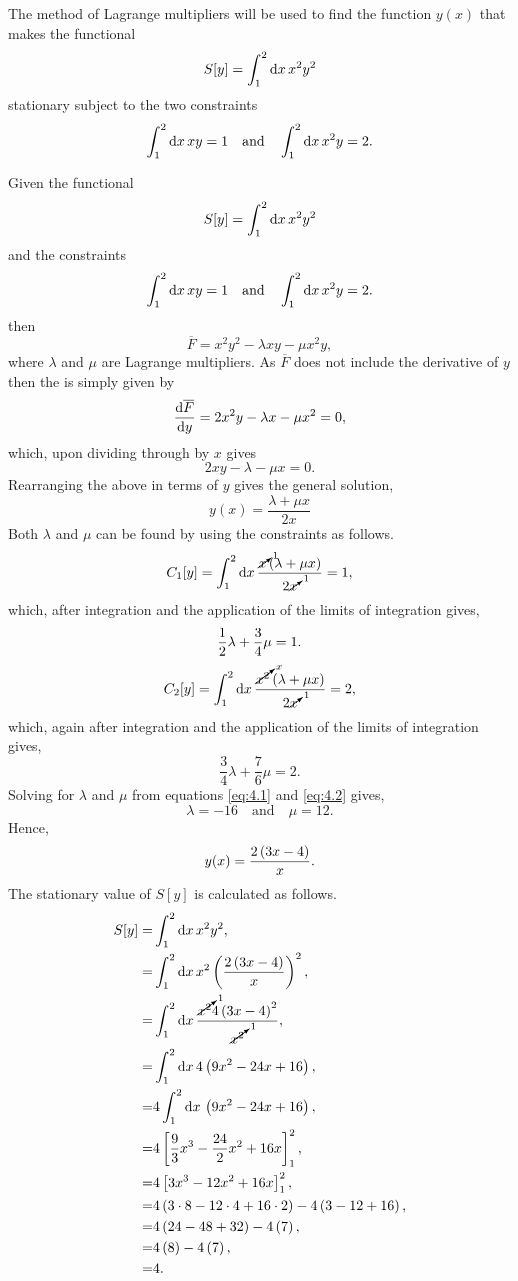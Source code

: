 \begin{question}
The method of Lagrange multipliers will be used to find the function $y(x)$ that makes the functional
\[
	S[y] = \int_{1}^{2}\mathrm{d} x\, x^2 y^2
\]
stationary subject to the two constraints
\[
	\int_{1}^{2}\mathrm{d} x\, x y = 1\quad\text{and}\quad\int_{1}^{2}\mathrm{d} x\, x^2 y = 2.
\]
\end{question}
Given the functional
\[
	S[y] = \int_{1}^{2}\mathrm{d} x\, x^2 y^2
\]
and the constraints 
\[
	\int_{1}^{2}\mathrm{d} x\, x y = 1\quad\text{and}\quad\int_{1}^{2}\mathrm{d} x\, x^2 y = 2.
\]
then
\[
	\overline{F} = x^2y^2 - \lambda x y - \mu x^2 y,
\]
where $\lambda$ and $\mu$ are Lagrange multipliers.  As $\overline{F}$ does not include the derivative of $y$ then the \el is simply given by
\[
	\frac{\mathrm{d}\overline{F}}{\mathrm{d}y} = 2x^2y-\lambda x - \mu x^2 = 0,
\]
which, upon dividing through by $x$ gives
\[
	2xy-\lambda - \mu x = 0.
\]
Rearranging the above in terms of $y$ gives the general solution,
\[
	y(x)= \frac{\lambda + \mu x}{2x}
\]
Both $\lambda$ and $\mu$ can be found by using the constraints as follows.
\[
	C_1[y] = \int_{1}^{2}\mathrm{d} x\, \frac{\cancelto{1}{x}\left(\lambda + \mu x\right)}{2\cancelto{1}{x}} = 1,
\]
which, after integration and the application of the limits of integration gives,
\begin{equation}
	\label{eq:4.1}
	\frac{1}{2} \lambda + \frac{3}{4}\mu=1.
\end{equation}
\[
	C_2[y] = \int_{1}^{2}\mathrm{d} x\, \frac{\cancelto{x}{x^2}\left(\lambda + \mu x\right)}{2\cancelto{1}{x}} = 2,
\]
which, again after integration and the application of the limits of integration gives,
\begin{equation}
	\label{eq:4.2}
	\frac{3}{4} \lambda + \frac{7}{6}\mu=2.
\end{equation}
Solving for $\lambda$ and $\mu$ from equations \eqref{eq:4.1} and \eqref{eq:4.2} gives,
\[
	\lambda = -16\quad\text{and}\quad \mu = 12.
\]
Hence,
\[
	y(x) = \frac{2\left(3x-4\right)}{x}.
\]
The stationary value of $S[y]$ is calculated as follows.
\begin{align*}
	S[y] =& \int_{1}^{2}\mathrm{d} x\, x^2y^2,\\
	=& \int_{1}^{2}\mathrm{d} x\, x^2\left(\frac{2\left(3x-4\right)}{x}\right)^2,\\
	=& \int_{1}^{2}\mathrm{d} x\,\frac{\cancelto{1}{x^2}4\left(3x-4\right)^2}{\cancelto{1}{x^2}},\\
	=& \int_{1}^{2}\mathrm{d} x\,4\left(9x^2-24x+16\right),\\
	=& 4\int_{1}^{2}\mathrm{d} x\,\left(9x^2-24x+16\right),\\
	=&4\left[\frac{9}{3}x^3-\frac{24}{2}x^2+16x\right]_1^2,\\
	=&4\left[3x^3-12x^2+16x\right]_1^2,\\
	=&4\left(3\cdot8-12\cdot4+16\cdot2\right)-4\left(3-12+16\right),\\
	=&4\left(24-48+32\right)-4\left(7\right),\\
	=&4\left(8\right)-4\left(7\right),\\
	=&4.
\end{align*}